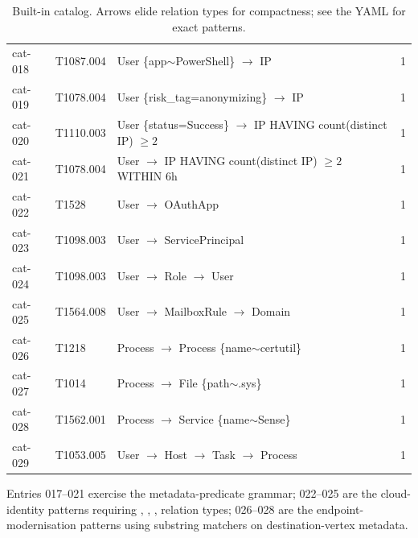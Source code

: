 \begin{table}[h]
\begin{tabular}{@{}llll@{}}
cat-018 & T1087.004 & User \{app$\sim$PowerShell\} $\to$ IP & 1 \\
cat-019 & T1078.004 & User \{risk\_tag=anonymizing\} $\to$ IP & 1 \\
cat-020 & T1110.003 & User \{status=Success\} $\to$ IP HAVING count(distinct IP) $\geq 2$ & 1 \\
cat-021 & T1078.004 & User $\to$ IP HAVING count(distinct IP) $\geq 2$ WITHIN 6h & 1 \\
cat-022 & T1528     & User $\to$ OAuthApp & 1 \\
cat-023 & T1098.003 & User $\to$ ServicePrincipal & 1 \\
cat-024 & T1098.003 & User $\to$ Role $\to$ User & 1 \\
cat-025 & T1564.008 & User $\to$ MailboxRule $\to$ Domain & 1 \\
cat-026 & T1218     & Process $\to$ Process \{name$\sim$certutil\} & 1 \\
cat-027 & T1014     & Process $\to$ File \{path$\sim$.sys\} & 1 \\
cat-028 & T1562.001 & Process $\to$ Service \{name$\sim$Sense\} & 1 \\
cat-029 & T1053.005 & User $\to$ Host $\to$ Task $\to$ Process & 1 \\
\bottomrule
\end{tabular}
\caption{Built-in catalog. Arrows elide relation types for
compactness; see the YAML for exact patterns.}
\end{table}

Entries 017--021 exercise the metadata-predicate grammar; 022--025
are the cloud-identity patterns requiring ,
, ,  relation types;
026--028 are the endpoint-modernisation patterns using substring
matchers on destination-vertex metadata.
